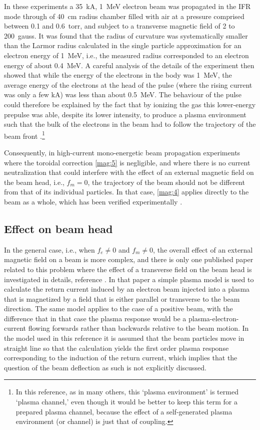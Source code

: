 \documentclass [12pt,a4paper,     ]{report} %
\begin{document}
   In these experiments a 35~kA, 1~MeV electron beam was propagated in the IFR mode through of 40~cm radius chamber filled with air at a pressure comprised between 0.1 and 0.6~torr, and subject to a transverse magnetic field of 2 to 200~gauss.  It was found that the radius of curvature was systematically smaller than the Larmor radius calculated in the single particle approximation for an electron energy of 1~MeV, i.e., the measured radius corresponded to an electron energy of about 0.4~MeV.  A careful analysis of the details of the experiment then showed that while the energy of the electrons in the body was 1~MeV, the average energy of the electrons at the head of the pulse (where the rising current was only a few kA) was less than about 0.5~MeV.  The behaviour of the pulse could therefore be explained by the fact that by ionizing the gas this lower-energy prepulse was able, despite its lower intensity, to produce a plasma environment such that the bulk of the electrons in the beam had to follow the trajectory of the beam front \cite[p.626]{DIDEN1977-}.\footnote{In this reference, as in many others, this `plasma environment' is termed `plasma channel,' even though it would be better to keep this term for a prepared plasma channel, because the effect of a self-generated plasma environment (or channel) is just that of coupling.}

   Consequently, in high-current mono-energetic beam propagation experiments where the toroidal correction \eqref{mag:5} is negligible, and where there is no current neutralization that could interfere with the effect of an external magnetic field on the beam head, i.e., $f_m = 0$, the trajectory of the beam should not be different from that of its individual particles.  In that case, \eqref{mag:4} applies directly to the beam as a whole, which has been verified experimentally \cite{HESTE1974-}.


\subsection{Effect on beam head}

   In the general case, i.e., when $f_e \neq 0$ and $f_m \neq 0$, the overall effect of an external magnetic field on a beam is more complex, and there is only one published paper related to this problem where the effect of a transverse field on the beam head is investigated in details, reference \cite{LEE--1971-}.  In that paper a simple plasma model is used to calculate the return current induced by an electron beam injected into a plasma that is magnetized by a field that is either parallel or transverse to the beam direction. The same model applies to the case of a positive beam, with the difference that in that case the plasma response would be a plasma-electron-current flowing forwards rather than backwards relative to the beam motion.  In the model used in this reference it is assumed that the beam particles move in straight line so that the calculation yields the first order plasma response corresponding to the induction of the return current, which implies that the question of the beam deflection as such is not explicitly discussed.
\end{document}
